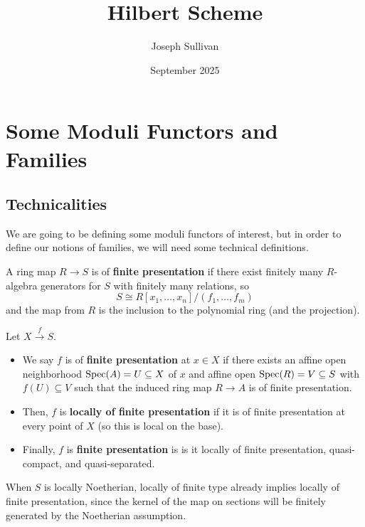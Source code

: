 \documentclass[12pt]{article}
\title{Hilbert Scheme}
\author{Joseph Sullivan}
\date{September 2025}
\begin{document}
\maketitle
\tableofcontents

\section{Some Moduli Functors and Families}

\subsection{Technicalities}

We are going to be defining some moduli functors of interest, but in order to define our notions of families, we will need some technical definitions.

\begin{defn}
    A ring map $R\to S$ is of \textbf{finite presentation} if there exist finitely many $R$-algebra generators for $S$ with finitely many relations, so
    \[S\cong R[x_1,\dots,x_n]/(f_1,\dots,f_m)\]
    and the map from $R$ is the inclusion to the polynomial ring (and the projection).
\end{defn}

\begin{defn}
    Let $X\xrightarrow{f} S$.

    \begin{itemize}
        \item We say $f$ is of \textbf{finite presentation} at $x\in X$ if there exists an affine open neighborhood $\operatorname{Spec}(A) = U\subseteq X$ of $x$ and affine open $\operatorname{Spec}(R)=V\subseteq S$ with $f(U)\subseteq V$ such that the induced ring map $R\to A$ is of finite presentation.

        \item Then, $f$ is \textbf{locally of finite presentation} if it is of finite presentation at every point of $X$ (so this is local on the base).

        \item Finally, $f$ is \textbf{finite presentation} is is it locally of finite presentation, quasi-compact, and quasi-separated.
    \end{itemize}
\end{defn}

\begin{eg}
    When $S$ is locally Noetherian, locally of finite type already implies locally of finite presentation, since the kernel of the map on sections will be finitely generated by the Noetherian assumption.
\end{eg}
\end{document}
